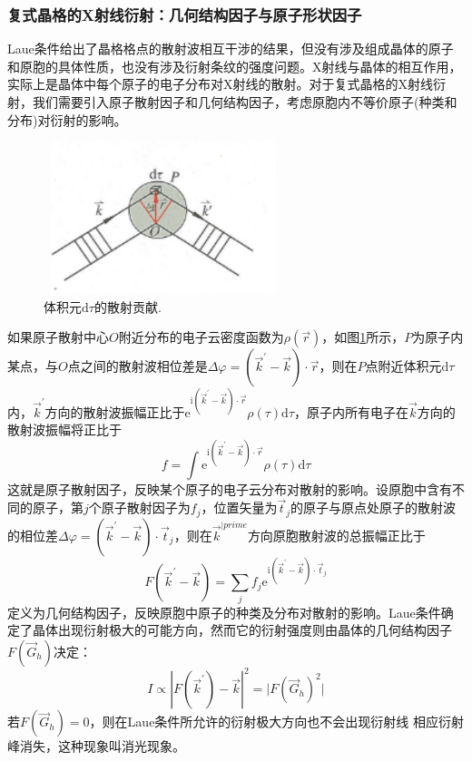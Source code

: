 \subsubsection{复式晶格的X射线衍射：几何结构因子与原子形状因子} 
Laue条件给出了晶格格点的散射波相互干涉的结果，但没有涉及组成晶体的原子和原胞的具体性质，也没有涉及衍射条纹的强度问题。X射线与晶体的相互作用，实际上是晶体中每个原子的电子分布对X射线的散射。对于复式晶格的X射线衍射，我们需要引入原子散射因子和几何结构因子，考虑原胞内不等价原子(种类和分布)对衍射的影响。
\begin{figure}[h!]
\centering
\vspace*{-0.05in}
\includegraphics[height=1.75in,width=2.75in,viewport=0 0 45 28,clip]{Figures/Electron_dispersion.png}
\caption{\small \textrm{体积元$\mathrm{d}\tau$的散射贡献.}}%
\label{Fig:Dispersion}
\end{figure}

如果原子散射中心$O$附近分布的电子云密度函数为$\rho(\vec r)$，如图\ref{Fig:Dispersion}所示，$P$为原子内某点，与$O$点之间的散射波相位差是$\Delta\varphi=(\vec k^{\prime}-\vec k)\cdot\vec r$，则在$P$点附近体积元$\mathrm{d}\tau$内，$\vec k^{\prime}$方向的散射波振幅正比于$\mathrm{e}^{\mathrm{i}(\vec k^{\prime}-\vec k)\cdot\vec r}\rho(\tau)\mathrm{d}\tau$，原子内所有电子在$\vec k$方向的散射波振幅将正比于
\begin{equation}
	f=\int\mathrm{e}^{\mathrm{i}(\vec k^{\prime}-\vec k)\cdot\vec r}\rho(\tau)\mathrm{d}\tau
	\label{eq:dispersion-coeff} \end{equation} 
	这就是原子散射因子，反映某个原子的电子云分布对散射的影响。设原胞中含有不同的原子，第$j$个原子散射因子为$f_j$，位置矢量为$\vec t_j$的原子与原点处原子的散射波的相位差$\Delta\varphi=(\vec k^{\prime}-\vec k)\cdot\vec t_j$，则在$\vec k^{|prime}$方向原胞散射波的总振幅正比于
	\begin{equation}
		F(\vec k^{\prime}-\vec k)=\sum_jf_j\mathrm{e}^{\mathrm{i}(\vec k^{\prime}-\vec k)\cdot\vec t_j}
		\label{eq:Geom_Structure-Coeff}
	\end{equation} 
定义为几何结构因子，反映原胞中原子的种类及分布对散射的影响。Laue条件确定了晶体出现衍射极大的可能方向，然而它的衍射强度则由晶体的几何结构因子$F(\vec G_h)$决定：
\begin{equation}
	I\propto\left|F(\vec k^{\prime})-\vec k\right|^2=\bigg|F(\vec G_h)^2\bigg|
	\label{eq:SSI-12}
\end{equation} 
若$F(\vec G_h)=0$，则在Laue条件所允许的衍射极大方向也不会出现衍射线 相应衍射峰消失，这种现象叫消光现象。

